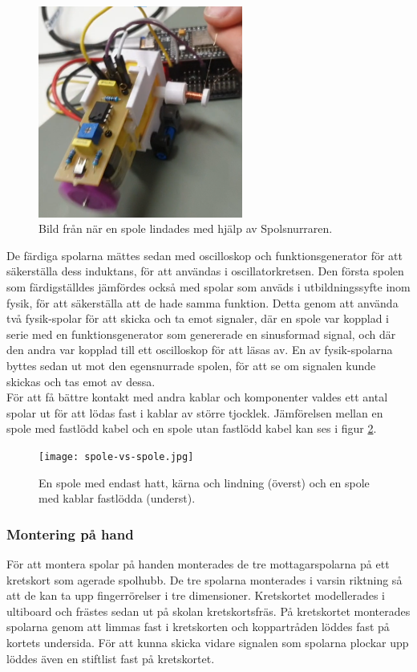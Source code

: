 \documentclass[a4paper]{article}
\begin{document}
\begin{sloppypar}
  \begin{figure}[H]
    \centering
    \includegraphics[width=0.6\textwidth]{spolsnurrare1.png}
    \caption{Bild från när en spole lindades med hjälp av Spolsnurraren.}
    \label{fig:Spolsnurrare}
  \end{figure}
  \noindent
  De färdiga spolarna mättes sedan med oscilloskop och funktionsgenerator för att säkerställa dess induktans, för att användas i oscillatorkretsen.
  Den första spolen som färdigställdes jämfördes också med spolar som anväds i utbildningssyfte inom fysik, för att säkerställa att de hade samma funktion.
  Detta genom att använda två fysik-spolar för att skicka och ta emot signaler, där en spole var kopplad i serie med en funktionsgenerator som genererade en sinusformad signal, och där den andra var kopplad till ett oscilloskop för att läsas av.
  En av fysik-spolarna byttes sedan ut mot den egensnurrade spolen, för att se om signalen kunde skickas och tas emot av dessa.
  \\
  För att få bättre kontakt med andra kablar och komponenter valdes ett antal spolar ut för att lödas fast i kablar av större tjocklek.
  Jämförelsen mellan en spole med fastlödd kabel och en spole utan fastlödd kabel kan ses i figur \ref{fig:SpoleVsSpole}.

  \begin{figure}[H]
    \centering
    \texttt{[image: spole-vs-spole.jpg]}
    \caption{En spole med endast hatt, kärna och lindning (överst) och en spole med kablar fastlödda (underst).}
    \label{fig:SpoleVsSpole}
  \end{figure}


  \subsubsection{Montering på hand} %
  För att montera spolar på handen monterades de tre mottagarspolarna på ett kretskort som agerade spolhubb.
  De tre spolarna monterades i varsin riktning så att de kan ta upp fingerrörelser i tre dimensioner.
  Kretskortet modellerades i ultiboard och frästes sedan ut på skolan kretskortsfräs.
  På kretskortet monterades spolarna genom att limmas fast i kretskorten och koppartråden löddes fast på kortets undersida.
  För att kunna skicka vidare signalen som spolarna plockar upp löddes även en stiftlist fast på kretskortet.



\end{sloppypar}
\end{document}
